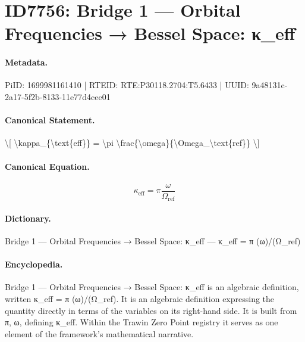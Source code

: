 \section*{ID7756: Bridge 1 — Orbital Frequencies → Bessel Space: κ\_eff}
\paragraph{Metadata.}
PiID: 1699981161410 | RTEID: RTE:P30118.2704:T5.6433 | UUID: 9a48131c-2a17-5f2b-8133-11e77d4cee01

\paragraph{Canonical Statement.}
\textbackslash{}[ \textbackslash{}kappa\_\{\textbackslash{}text\{eff\}\} = \textbackslash{}pi \textbackslash{}frac\{\textbackslash{}omega\}\{\textbackslash{}Omega\_\textbackslash{}text\{ref\}\} \textbackslash{}]

\paragraph{Canonical Equation.}
\[
\kappa_{\text{eff}} = \pi \frac{\omega}{\Omega_\text{ref}}
\]

\paragraph{Dictionary.}
Bridge 1 — Orbital Frequencies → Bessel Space: κ\_eff — κ\_eff = π (ω)/(Ω\_ref)

\paragraph{Encyclopedia.}
Bridge 1 — Orbital Frequencies → Bessel Space: κ\_eff is an algebraic definition, written κ\_eff = π (ω)/(Ω\_ref). It is an algebraic definition expressing the quantity directly in terms of the variables on its right-hand side. It is built from π, ω, defining κ\_eff. Within the Trawin Zero Point registry it serves as one element of the framework's mathematical narrative.
